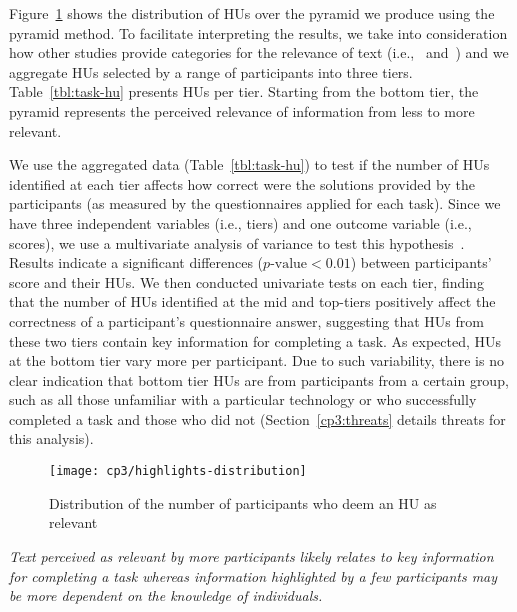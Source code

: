 Figure~\ref{fig:highlights-distribution} shows the distribution of HUs over the pyramid we produce using the pyramid method.
To facilitate interpreting the results,
we take into consideration how other studies provide categories for the relevance of
text (i.e.,~\cite{Petrosyan2015} and~\cite{Jiang2017}) and 
we aggregate HUs selected by a range of participants into three tiers.
Table~\ref{tbl:task-hu} presents HUs per tier.
Starting from the bottom tier, the pyramid represents the perceived relevance of information from less to more relevant.


We use the aggregated data (Table~\ref{tbl:task-hu}) to test if the number of HUs identified at each tier affects how correct were the solutions provided by the participants (as measured by the questionnaires applied for each task). 
Since we have three independent variables (i.e., tiers) and one outcome variable (i.e., scores),
we use a multivariate analysis of variance to test this hypothesis~\cite{wohlin2012}. 
Results indicate a significant differences ($p\text{-value} < 0.01$) between participants' score and their HUs.
We then conducted univariate tests on each tier,
finding that 
the number of HUs identified at the mid and top-tiers 
positively affect the correctness of a participant's questionnaire answer, 
suggesting that HUs from these two tiers contain key
information for completing a task.
As expected, HUs at the bottom tier vary more per participant.
Due to such variability, there is no clear indication
that bottom tier HUs are from participants from a certain group, such as all those
unfamiliar with a particular technology or  who successfully
completed a task and those who did not (Section~\ref{cp3:threats} details threats for this analysis).







\begin{figure}
    \centering
    \texttt{[image: cp3/highlights-distribution]}
    \caption{Distribution of the number of participants who deem an HU as relevant}
    \label{fig:highlights-distribution}
\end{figure}










\medskip
\begin{bluequote}
    \textit{Text perceived as relevant by more participants likely relates
    to key information for completing a task whereas information
    highlighted by a few participants may be more dependent on the knowledge of individuals.}
\end{bluequote}
